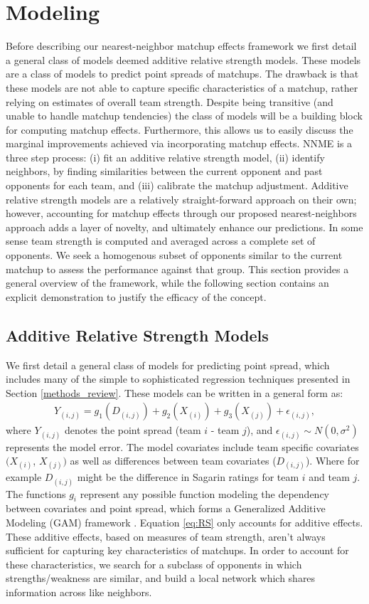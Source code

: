 \documentclass[letterpaper,12pt]{article}
\begin{document}
\section{Modeling\label{sec:NNME}}
Before describing our nearest-neighbor matchup effects framework we first detail a general class of models deemed additive relative strength models. These models are a class of models to predict point spreads of matchups. The drawback is that these models are not able to capture specific characteristics of a matchup, rather relying on estimates of overall team strength. Despite being transitive (and unable to handle matchup tendencies) the class of models will be a building block for computing matchup effects. Furthermore, this allows us to easily discuss the marginal improvements achieved via incorporating matchup effects. NNME is a three step process: (i) fit an additive relative strength model, (ii) identify neighbors, by finding similarities between the current opponent and past opponents for each team, and (iii) calibrate the matchup adjustment. Additive relative strength models are a relatively straight-forward approach on their own; however, accounting for matchup effects through our proposed nearest-neighbors approach adds a layer of novelty, and ultimately enhance our predictions. In some sense team strength is computed and averaged across a complete set of opponents. We seek a homogenous subset of opponents similar to the current matchup to assess the performance against that group. This section provides a general overview of the framework, while the following section contains an explicit demonstration to justify the efficacy of the concept.

\subsection{Additive Relative Strength Models}
We first detail a general class of models for predicting point spread, which includes many of the simple to sophisticated regression techniques presented in Section \ref{methods_review}. These models can be written in a general form as:
\begin{eqnarray}
Y_{(i,j)} = g_1(D_{(i,j)}) + g_2(X_{(i)}) + g_3(X_{(j)}) +  \epsilon_{(i,j)},
\label{eq:RS}
\end{eqnarray}
where $Y_{(i,j)}$ denotes the point spread (team $i$ - team $j$), and $\epsilon_{(i,j)}\sim N(0,\sigma^2)$ represents the model error. The model covariates include team specific covariates $(X_{(i)}$, $X_{(j)})$ as well as differences between team covariates ($D_{(i,j)}$). Where for example $D_{(i,j)}$ might be the difference in Sagarin ratings for team $i$ and team $j$. The functions $g_i$ represent any possible function modeling the dependency between covariates and point spread, which forms a Generalized Additive Modeling (GAM) framework \citep{GAMs}. Equation \ref{eq:RS} only accounts for additive effects. These additive effects, based on measures of team strength, aren't always sufficient for capturing key characteristics of matchups. In order to account for these characteristics, we search for a subclass of opponents in which strengths/weakness are similar, and build a local network which shares information across like neighbors.  
\end{document}
